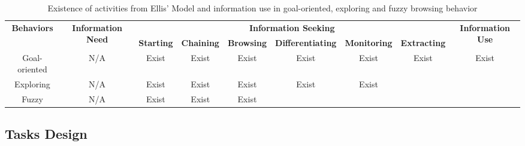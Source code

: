 \begin{table}[H]
    \small
    \centering
    \caption{Existence of activities from Ellis' Model and information use in 
    goal-oriented, exploring and fuzzy browsing behavior}
    \begin{adjustbox}{width=\textwidth}
        \begin{tabular}{ccccccccc}
            \toprule
            \multicolumn{1}{c}{\multirow{2}{*}{\textbf{Behaviors}}}  & \multicolumn{1}{c}{\multirow{2}{*}{\textbf{Information Need}}} & \multicolumn{6}{c}{\textbf{Information Seeking}}                                    & \multicolumn{1}{c}{\multirow{2}{*}{\textbf{Information Use}}} \\ \cline{3-8}
            \multicolumn{1}{c}{}                                     & \multicolumn{1}{c}{}                                  & \textbf{Starting} & \textbf{Chaining} & \textbf{Browsing} & \textbf{Differentiating} & \textbf{Monitoring} & \textbf{Extracting} & \multicolumn{1}{c}{}  \\
            \hline
            Goal-oriented                                            &   N/A                                                 &     Exist         &      Exist        &   Exist           &        Exist               &       Exist           &        Exist          &      Exist              \\
            Exploring                                                &   N/A                                                 &     Exist         &      Exist        &   Exist           &        Exist               &       Exist           &                     &                       \\
            Fuzzy                                                    &   N/A                                                 &     Exist         &      Exist        &   Exist           &                          &                     &                     &                       \\
            \bottomrule
        \end{tabular}
        \label{table:ellis}
    \end{adjustbox}
\end{table}

\subsection{Tasks Design}
\label{sec:task-design}

